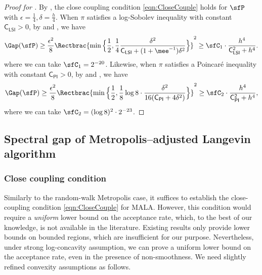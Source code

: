 \documentclass[11pt]{article}
\newcommand{\CPI}{\mathsf{C_{PI}}}
\newcommand{\CLSI}{\mathsf{C_{LSI}}}
\begin{document}
\begin{proof}[Proof for ]
%
By , the close coupling condition \eqref{eqn:CloseCouple} holds for $\sfP$ with $\epsilon = \frac{1}{4}, \delta = \frac{h}{4}$.
%
When $\pi$ satisfies a log-Sobolev inequality with constant $\CLSI>0$, by  and , we have
\begin{equation}
    \Gap(\sfP) \ge \frac{\epsilon^2}{8} \Rectbrac{ \min \Big\{ \frac{1}{2} , \frac{1}{4} \frac{\delta^2}{\CLSI+(1+\mee^{-1})\delta^2} \Big\} }^2 \ge \sfC_1 \cdot \frac{ h^4 }{ \mathsf{C_{LSI}^2} + h^4 }.
\end{equation}
where we can take $\sfC_1 = 2^{-20}$.
%
Likewise, when $\pi$ satisfies a Poincar\'e inequality with constant $\CPI>0$, by  and , we have
\begin{equation}
    \Gap(\sfP) \ge \frac{\epsilon^2}{8} \Rectbrac{ \min \Big\{ \frac{1}{2} , \frac{1}{8} \log 8 \cdot \frac{\delta^2}{16(\CPI+4\delta^2)} \Big\} }^2 \ge \sfC_2 \cdot \frac{ h^4 }{ \mathsf{C_{PI}^2} + h^4 },
\end{equation}
where we can take $\sfC_2 = (\log 8)^2 \cdot 2^{-23} $.
%
\end{proof}



\subsection{Spectral gap of Metropolis--adjusted Langevin algorithm}
\label{sec:SpecGapMALA}

\subsubsection{Close coupling condition}
\label{sec:CloseCoupleMALA}

Similarly to the random-walk Metropolis case, it suffices to establish the close-coupling condition \eqref{eqn:CloseCouple} for MALA.
%
However, this condition would require a \emph{uniform} lower bound on the acceptance rate, which, to the best of our knowledge, is not available in the literature.
Existing results \citep{MR3020951,pmlr-v75-dwivedi18a,JMLR:v23:21-1184} only provide lower bounds on bounded regions, which are insufficient for our purpose.
%
Nevertheless, under strong log-concavity assumption, we can prove a uniform lower bound on the acceptance rate, even in the presence of non-smoothness.
We need slightly refined convexity assumptions as follows.
\end{document}
